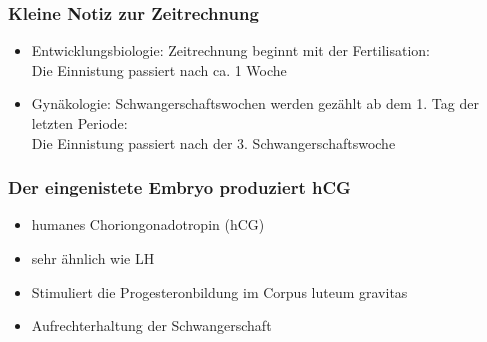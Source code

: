 \documentclass{beamer}
\begin{document}
\begin{frame}
\frametitle{Kleine Notiz zur Zeitrechnung}

\begin{itemize}
\item
Entwicklungsbiologie: Zeitrechnung beginnt mit der Fertilisation: \\
Die Einnistung passiert nach ca. 1 Woche
\pause
\item
Gynäkologie: Schwangerschaftswochen werden gezählt ab dem 1. Tag der letzten Periode: \\
Die Einnistung passiert nach der 3. Schwangerschaftswoche

\end{itemize}
\end{frame}

\begin{frame}
\frametitle{Der  eingenistete Embryo produziert hCG}

\begin{itemize}
    \item 
    humanes Choriongonadotropin (hCG)
    \item 
    sehr ähnlich wie LH
    \item
    Stimuliert die Progesteronbildung im Corpus luteum gravitas
    \item
    Aufrechterhaltung der Schwangerschaft
    
\end{itemize}


\end{frame}
\end{document}
